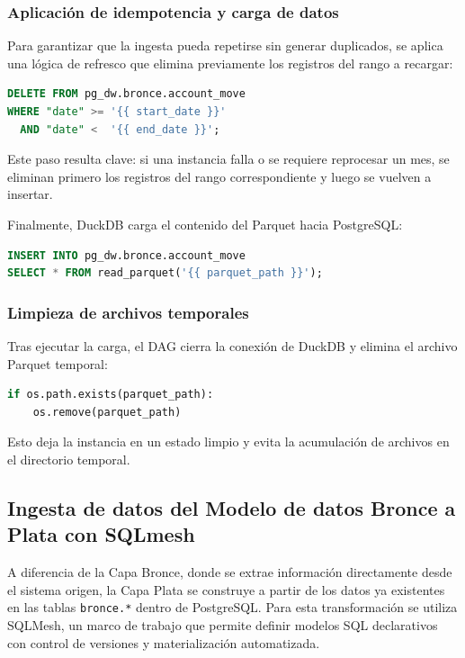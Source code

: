 \subsubsection{Aplicación de idempotencia y carga de datos}

Para garantizar que la ingesta pueda repetirse sin generar duplicados, se aplica una lógica de refresco que elimina previamente los registros del rango a recargar:

\begin{lstlisting}[language=SQL, breaklines=true]
DELETE FROM pg_dw.bronce.account_move
WHERE "date" >= '{{ start_date }}'
  AND "date" <  '{{ end_date }}';
\end{lstlisting}

Este paso resulta clave: si una instancia falla o se requiere reprocesar un mes, se eliminan primero los registros del rango correspondiente y luego se vuelven a insertar.

Finalmente, DuckDB carga el contenido del Parquet hacia PostgreSQL:

\begin{lstlisting}[language=SQL, breaklines=true]
INSERT INTO pg_dw.bronce.account_move
SELECT * FROM read_parquet('{{ parquet_path }}');
\end{lstlisting}

\subsubsection{Limpieza de archivos temporales}

Tras ejecutar la carga, el DAG cierra la conexión de DuckDB y elimina el archivo Parquet temporal:

\begin{lstlisting}[language=Python, breaklines=true]
if os.path.exists(parquet_path):
    os.remove(parquet_path)
\end{lstlisting}

Esto deja la instancia en un estado limpio y evita la acumulación de archivos en el directorio temporal.


\subsection{Ingesta de datos del Modelo de datos Bronce a Plata con SQLmesh}

A diferencia de la Capa Bronce, donde se extrae información directamente desde el sistema origen, la Capa Plata se construye a partir de los datos ya existentes en las tablas \texttt{bronce.*} dentro de PostgreSQL. Para esta transformación se utiliza SQLMesh, un marco de trabajo que permite definir modelos SQL declarativos con control de versiones y materialización automatizada.

